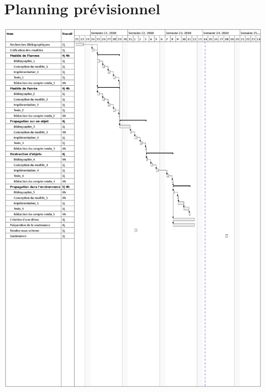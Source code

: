 \documentclass[a4paper,10pt]{article}
\begin{document}
\section{Planning prévisionnel}

        \includegraphics[scale=0.8]{../Planning/GANTT.ps}
        
\end{document}
